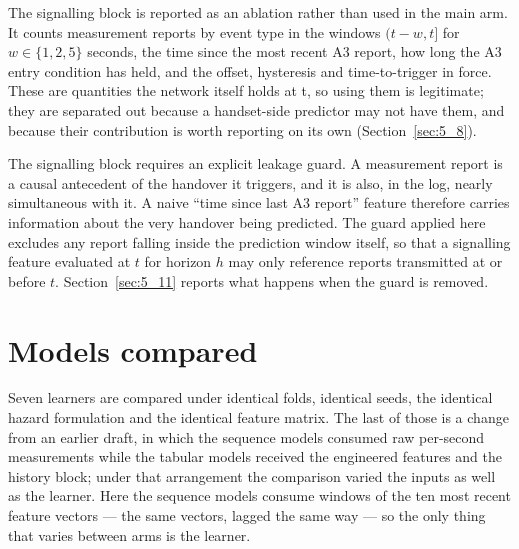 The signalling block is reported as an ablation rather than used in the main arm. It counts measurement reports by event type in the windows $(t - w, t]$ for $w \in \{1, 2, 5\}$ seconds, the time since the most recent A3 report, how long the A3 entry condition has held, and the offset, hysteresis and time-to-trigger in force. These are quantities the network itself holds at t, so using them is legitimate; they are separated out because a handset-side predictor may not have them, and because their contribution is worth reporting on its own (Section~\ref{sec:5_8}).

The signalling block requires an explicit leakage guard. A measurement report is a causal antecedent of the handover it triggers, and it is also, in the log, nearly simultaneous with it. A naive ``time since last A3 report'' feature therefore carries information about the very handover being predicted. The guard applied here excludes any report falling inside the prediction window itself, so that a signalling feature evaluated at $t$ for horizon $h$ may only reference reports transmitted at or before $t$. Section~\ref{sec:5_11} reports what happens when the guard is removed.


\section{Models compared}
\label{sec:4_7}

Seven learners are compared under identical folds, identical seeds, the identical hazard formulation and the identical feature matrix. The last of those is a change from an earlier draft, in which the sequence models consumed raw per-second measurements while the tabular models received the engineered features and the history block; under that arrangement the comparison varied the inputs as well as the learner. Here the sequence models consume windows of the ten most recent feature vectors --- the same vectors, lagged the same way --- so the only thing that varies between arms is the learner.

